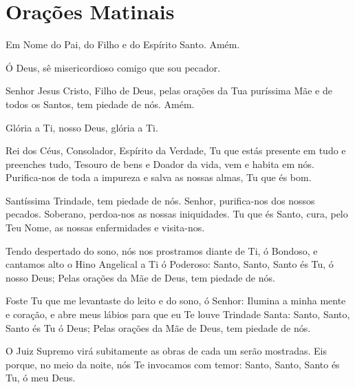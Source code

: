 \documentclass{subfiles}
\begin{document}
\chapter{Orações Matinais}

 
Em Nome do Pai, do Filho e do Espírito Santo. Amém. 
 
 
Ó Deus, sê misericordioso comigo que sou pecador. 
  
Senhor Jesus Cristo, Filho de Deus, pelas orações da Tua puríssima Mãe 
e de todos os Santos, tem piedade de nós. Amém. 
 
Glória a Ti, nosso Deus, glória a Ti. 
 
Rei dos Céus, Consolador, Espírito da Verdade, Tu que estás presente 
em tudo e preenches tudo, Tesouro de bens e Doador da vida, vem e habita 
em nós. Purifica-nos de toda a impureza e salva as nossas almas, Tu que és 
bom. 
 
\trisagion{} \thrice{}

Santíssima Trindade, tem piedade de nós. Senhor, purifica-nos dos 
nossos pecados. Soberano, perdoa-nos as nossas iniquidades. Tu que és Santo, 
cura, pelo Teu Nome, as nossas enfermidades e visita-nos.
 
\mercy{} 

\Doxology{}
 
\ourFather{}


Tendo despertado do sono, nós nos prostramos diante de Ti, ó 
Bondoso, e cantamos alto o Hino Angelical a Ti ó Poderoso: Santo, Santo, Santo 
és Tu, ó nosso Deus; Pelas orações da Mãe de Deus, tem piedade de nós. 
 
\doxology{}

Foste Tu que me levantaste do leito e do sono, ó Senhor: Ilumina a minha mente e
coração, e abre meus lábios para que eu Te louve Trindade Santa: Santo, Santo,
Santo és Tu ó Deus; Pelas orações da Mãe de Deus, tem piedade de nós. 
 
\nowandever{}

O Juiz Supremo virá subitamente as obras de cada um serão mostradas. Eis porque,
no meio da noite, nós Te invocamos com temor: Santo, Santo, Santo és Tu, ó meu
Deus. 
\end{document}
